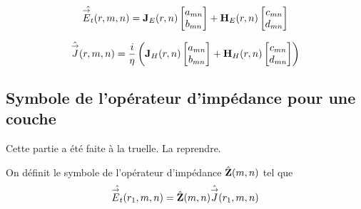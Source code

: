         \begin{equation}
            \hat{\vE_t}(r,m,n) = 
            \mJ_{E}(r,n)
            \begin{bmatrix}
                a_{mn}
                \\
                b_{mn}
            \end{bmatrix}
            + 
            \mH_{E}(r,n)
            \begin{bmatrix}
                c_{mn}
                \\
                d_{mn}
            \end{bmatrix}
        \end{equation}

        \begin{equation}
            \hat{\vJ}(r,m,n) = \frac{i}{\eta}
            \left(
            \mJ_{H}(r,n)
            \begin{bmatrix}
                a_{mn}
                \\
                b_{mn}
            \end{bmatrix}
            + 
            \mH_{H}(r,n)
            \begin{bmatrix}
                c_{mn}
                \\
                d_{mn}
            \end{bmatrix}
            \right)
        \end{equation}

    \subsection{Symbole de l'opérateur d'impédance pour une couche}

        \begin{figure}[!hbt]
          \centering
          \begin{tikzpicture}
            
          \end{tikzpicture}
        \end{figure}

        \begin{TODO}
          Cette partie a été faite à la truelle. La reprendre.
        \end{TODO}

        \begin{defn}
          On définit le symbole de l'opérateur d'impédance \(\hat{\mZ}(m,n)\) tel que 
          \[
              \hat{\vE_t}(r_1,m,n) = \hat{\mZ}(m,n)\hat{\vJ}(r_1,m,n)
          \]
        \end{defn}

